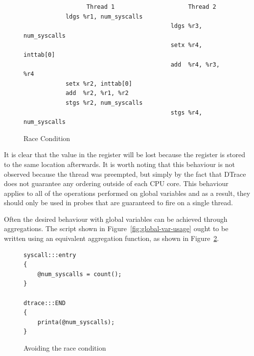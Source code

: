 \begin{figure}
  \begin{lstlisting}
                  Thread 1                     Thread 2
            ldgs %r1, num_syscalls
                                          ldgs %r3, num_syscalls
                                          setx %r4, inttab[0]
                                          add  %r4, %r3, %r4
            setx %r2, inttab[0]
            add  %r2, %r1, %r2
            stgs %r2, num_syscalls
                                          stgs %r4, num_syscalls
  \end{lstlisting}
  \caption{Race Condition}
  \label{fig:race}
\end{figure}

\noindent
It is clear that the value in the  register will be lost because
the register  is stored to the same location afterwards. It is
worth noting that this behaviour is not observed because the thread was
preempted, but simply by the fact that DTrace does not guarantee any ordering
outside of each CPU core. This behaviour applies to all of the operations
performed on global variables and as a result, they should only be used in
probes that are guaranteed to fire on a single thread. \newline

\noindent
Often the desired behaviour with global variables can be achieved through
aggregations. The script shown in Figure~\ref{fig:global-var-usage} ought to be
written using an equivalent aggregation function, as shown in
Figure~\ref{fig:avoiding-the-race}.

\begin{figure}
  \begin{lstlisting}
syscall:::entry
{
    @num_syscalls = count();
}

dtrace:::END
{
    printa(@num_syscalls);
}
  \end{lstlisting}
  \caption{Avoiding the race condition}
  \label{fig:avoiding-the-race}
\end{figure}
